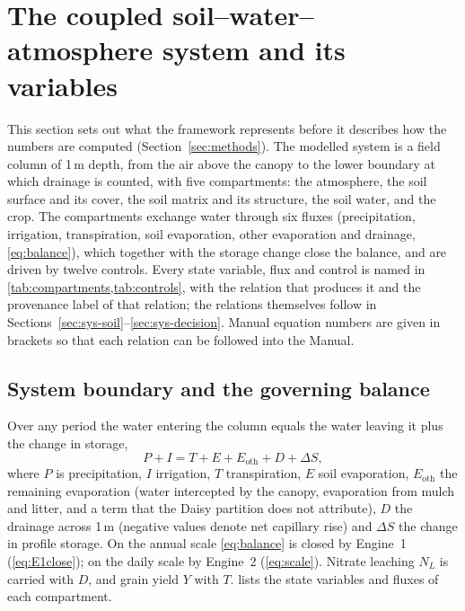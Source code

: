 \section{The coupled soil--water--atmosphere system and its variables}
\label{sec:system}
This section sets out what the framework represents before it describes how the numbers are computed (Section~\ref{sec:methods}). The modelled system is a field column of 1\,m depth, from the air above the canopy to the lower boundary at which drainage is counted, with five compartments: the atmosphere, the soil surface and its cover, the soil matrix and its structure, the soil water, and the crop. The compartments exchange water through six fluxes (precipitation, irrigation, transpiration, soil evaporation, other evaporation and drainage, \cref{eq:balance}), which together with the storage change close the balance, and are driven by twelve controls. Every state variable, flux and control is named in \cref{tab:compartments,tab:controls}, with the relation that produces it and the provenance label of that relation; the relations themselves follow in Sections~\ref{sec:sys-soil}--\ref{sec:sys-decision}. Manual equation numbers are given in brackets so that each relation can be followed into the Manual.

\subsection{System boundary and the governing balance}
\label{sec:sys-balance}
Over any period the water entering the column equals the water leaving it plus the change in storage,
\begin{equation}
P+I=T+E+E_{\mathrm{oth}}+D+\Delta S,
\label{eq:balance}
\end{equation}
where $P$ is precipitation, $I$ irrigation, $T$ transpiration, $E$ soil evaporation, $E_{\mathrm{oth}}$ the remaining evaporation (water intercepted by the canopy, evaporation from mulch and litter, and a term that the Daisy partition does not attribute), $D$ the drainage across 1\,m (negative values denote net capillary rise) and $\Delta S$ the change in profile storage. On the annual scale \cref{eq:balance} is closed by Engine~1 (\cref{eq:E1close}); on the daily scale by Engine~2 (\cref{eq:scale}). Nitrate leaching $N_L$ is carried with $D$, and grain yield $Y$ with $T$.  lists the state variables and fluxes of each compartment.

